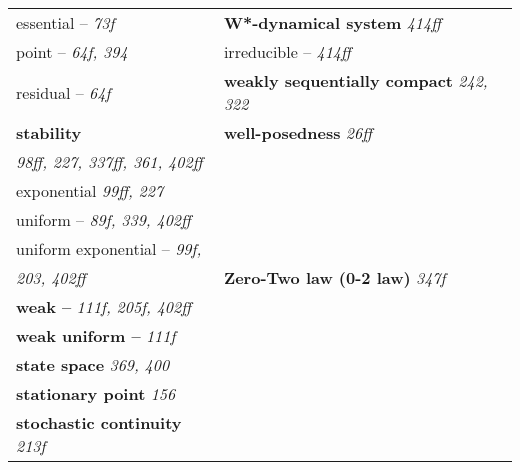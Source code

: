 \documentclass{article}
\begin{document}
\begin{longtable}{p{}p{}}
\quad essential -- \textit{73f} & \textbf{W*-dynamical system} \textit{414ff} \\
\quad point -- \textit{64f, 394} & \quad irreducible -- \textit{414ff} \\
\quad residual -- \textit{64f} & \textbf{weakly sequentially compact} \textit{242, 322} \\
\textbf{stability} & \textbf{well-posedness} \textit{26ff} \\
\quad \textit{98ff, 227, 337ff, 361, 402ff} & \\
\quad exponential \textit{99ff, 227} & \\
\quad uniform -- \textit{89f, 339, 402ff} & \\
\quad uniform exponential -- \textit{99f,} & \\
\quad\quad \textit{203, 402ff} & \textbf{Zero-Two law (0-2 law)} \textit{347f} \\
\textbf{weak --} \textit{111f, 205f, 402ff} & \\
\textbf{weak uniform --} \textit{111f} & \\
\textbf{state space} \textit{369, 400} & \\
\textbf{stationary point} \textit{156} & \\
\textbf{stochastic continuity} \textit{213f} & \\

\end{longtable}
\end{document}

